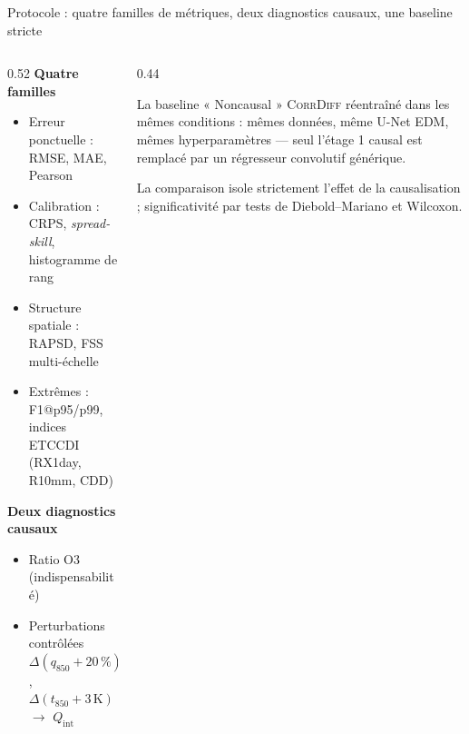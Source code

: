 \documentclass[aspectratio=169,10pt]{beamer}
\newcommand{\CorrDiff}{\textsc{CorrDiff}}
\begin{document}
\begin{frame}{Protocole : quatre familles de métriques, deux diagnostics causaux, une baseline stricte}
  \begin{columns}[T]
    \begin{column}{0.52\textwidth}
      \small
      \textbf{Quatre familles}
      \begin{itemize}
        \item Erreur ponctuelle : RMSE, MAE, Pearson
        \item Calibration : CRPS, \emph{spread-skill}, histogramme de rang
        \item Structure spatiale : RAPSD, FSS multi-échelle
        \item Extrêmes : F1@p95/p99, indices ETCCDI (RX1day, R10mm, CDD)
      \end{itemize}
      \textbf{Deux diagnostics causaux}
      \begin{itemize}
        \item Ratio O3 (indispensabilité)
        \item Perturbations contrôlées $\Delta(q_{850}\!+\!20\,\%)$,
              $\Delta(t_{850}\!+\!3\,\mathrm{K})$ $\to$ $Q_{\mathrm{int}}$
      \end{itemize}
    \end{column}
    \begin{column}{0.44\textwidth}
      \begin{block}{La baseline « Noncausal »}
        \small \CorrDiff{} \alert{réentraîné dans les mêmes conditions} : mêmes données,
        même U-Net EDM, mêmes hyperparamètres --- seul l'étage 1 causal est remplacé
        par un régresseur convolutif générique.
      \end{block}
      \vspace{0.1cm}
      {\footnotesize La comparaison isole strictement l'effet de la causalisation ;
      significativité par tests de Diebold--Mariano et Wilcoxon.}
    \end{column}
  \end{columns}
\end{frame}
\end{document}
